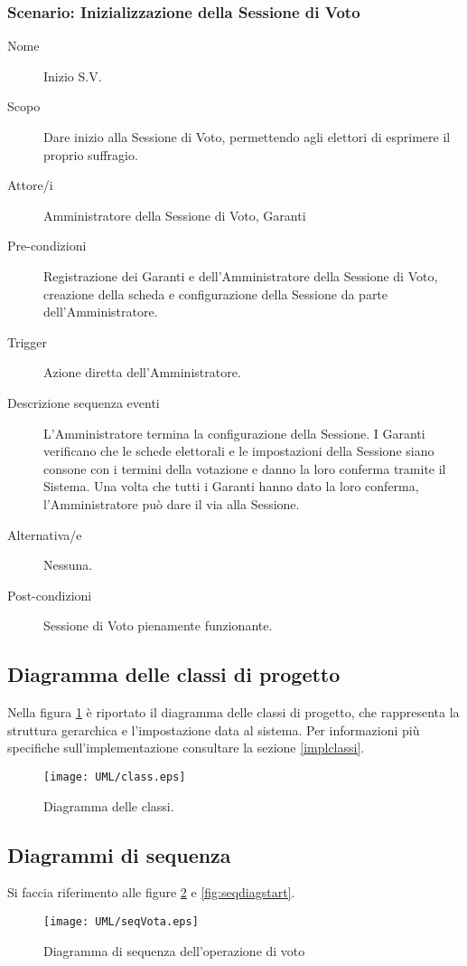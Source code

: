 \subsubsection{Scenario: Inizializzazione della Sessione di Voto}
\begin{description}
	\item[Nome] Inizio S.V.
	\item[Scopo] Dare inizio alla Sessione di Voto, permettendo agli elettori di esprimere il proprio suffragio.
	\item[Attore/i] Amministratore della Sessione di Voto, Garanti
	\item[Pre-condizioni] Registrazione dei Garanti e dell'Amministratore della Sessione di Voto, creazione della scheda e configurazione della Sessione da parte dell'Amministratore.
	\item[Trigger] Azione diretta dell'Amministratore.
	\item[Descrizione sequenza eventi] L'Amministratore termina la configurazione della Sessione. I Garanti verificano che le schede elettorali e le impostazioni della Sessione siano consone con i termini della votazione e danno la loro conferma tramite il Sistema. Una volta che tutti i Garanti hanno dato la loro conferma, l'Amministratore può dare il via alla Sessione.
	\item[Alternativa/e] Nessuna.
	\item[Post-condizioni] Sessione di Voto pienamente funzionante.
\end{description}


\subsection{Diagramma delle classi di progetto}
\label{subsec:projclassdiag}
Nella figura \ref{fig:classdiag} è riportato il diagramma delle classi di progetto, che rappresenta la struttura gerarchica e l'impostazione data al sistema. Per informazioni più specifiche sull'implementazione consultare la sezione \ref{implclassi}.
\begin{figure}[ht]
	\centering
	\texttt{[image: UML/class.eps]}
	\caption{Diagramma delle classi.}
	\label{fig:classdiag}
\end{figure}



\subsection{Diagrammi di sequenza}
Si faccia riferimento alle figure \ref{fig:seqdiagvota} e \ref{fig:seqdiagstart}.
\begin{figure}[ht]
	\centering
	\texttt{[image: UML/seqVota.eps]}
	\caption{Diagramma di sequenza dell'operazione di voto}
	\label{fig:seqdiagvota}
\end{figure}


